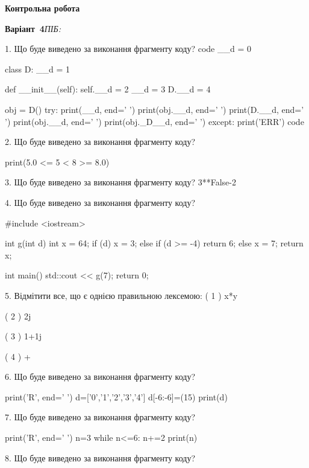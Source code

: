 \documentclass[11pt]{article}
\begin{document}
{\large\textbf{Контрольна робота}}

\textbf{Варіант \No\,4}\hfill \textit{ПІБ:}\,\underline{\hspace{60mm}}
\vspace{4mm}

1. Що буде виведено за виконання фрагменту коду?
code
__d = 0

class D:
    __d = 1
    
    def __init__(self):
        self.__d = 2
        __d = 3
        D.__d = 4

obj = D()
try:
    print(__d, end=' ')
    print(obj.__d, end=' ')
    print(D.__d, end=' ')
    print(obj.__d, end=' ')
    print(obj._D__d, end=' ')
except:
    print('ERR')
code


2. Що буде виведено за виконання фрагменту коду?

print(5.0 <= 5 < 8 >= 8.0)


3. Що буде виведено за виконання фрагменту коду?
3**False-2

4. Що буде виведено за виконання фрагменту коду?

#include <iostream>

int g(int d){
    int x = 64;
    if (d) 
        x = 3;
    else if (d >= -4)
         return 6;
    else
         x = 7;
    return x;
}

int main(){
    std::cout << g(7);
    return 0;
}



5. %
Відмітити все, що є однією правильною лексемою:
( 1 ) x*y

( 2 ) 2j

( 3 ) 1+1j

( 4 ) +


6. Що буде виведено за виконання фрагменту коду?

print('R', end=' ')
d=['0','1','2','3','4']
d[-6:-6]=(15)
print(d)



7. Що буде виведено за виконання фрагменту коду?

print('R', end=' ')
n=3
while n<=6:
    n+=2
print(n)



8. Що буде виведено за виконання фрагменту коду?
\end{document}

